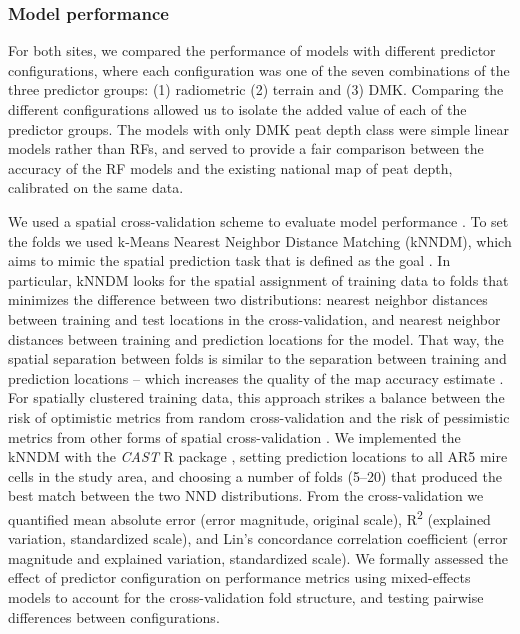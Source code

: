 \documentclass[soil, manuscript]{copernicus}
\begin{document}
\subsubsection{Model performance}

For both sites, we compared the performance of models with different predictor configurations, where each configuration was one of the seven combinations of the three predictor groups: (1) radiometric (2) terrain and (3) DMK.
Comparing the different configurations allowed us to isolate the added value of each of the predictor groups.
The models with only DMK peat depth class were simple linear models rather than RFs, and served to provide a fair comparison between the accuracy of the RF models and the existing national map of peat depth, calibrated on the same data.

We used a spatial cross-validation scheme to evaluate model performance \citep{wadouxSpatialCrossvalidationNot2021, meyerMachineLearningbasedGlobal2022}.
To set the folds we used k-Means Nearest Neighbor Distance Matching (kNNDM), which aims to mimic the spatial prediction task that is defined as the goal \citep{linnenbrinkKNNDMCVKfold2024}.
In particular, kNNDM looks for the spatial assignment of training data to folds that minimizes the difference between two distributions: nearest neighbor distances between training and test locations in the cross-validation, and nearest neighbor distances between training and prediction locations for the model.
That way, the spatial separation between folds is similar to the separation between training and prediction locations -- which increases the quality of the map accuracy estimate \citep{linnenbrinkKNNDMCVKfold2024}.
For spatially clustered training data, this approach strikes a balance between the risk of optimistic metrics from random cross-validation and the risk of pessimistic metrics from other forms of spatial cross-validation \citep{wadouxSpatialCrossvalidationNot2021}.
We implemented the kNNDM with the \emph{CAST} R package \citep[v1.0,][]{meyerCASTPackageTraining2024}, setting prediction locations to all AR5 mire cells in the study area, and choosing a number of folds (5--20) that produced the best match between the two NND distributions.
From the cross-validation we quantified mean absolute error (error magnitude, original scale), R\textsuperscript{2} (explained variation, standardized scale), and Lin's concordance correlation coefficient (error magnitude and explained variation, standardized scale).
We formally assessed the effect of predictor configuration on performance metrics using mixed-effects models to account for the cross-validation fold structure, and testing pairwise differences between configurations.
\end{document}
